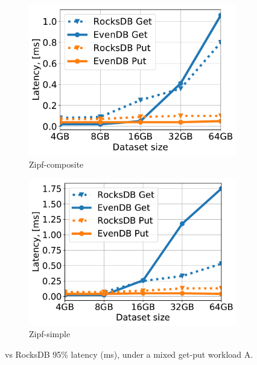 \begin{figure}[htb]
\centering
\begin{subfigure}{0.49\linewidth}
\includegraphics[width=\textwidth]{figs/tail_flurry_line.pdf}
\caption{Zipf-composite}
\label{fig:tail_latency:co}
\end{subfigure}
\begin{subfigure}{0.49\linewidth}
\includegraphics[width=\textwidth]{figs/tail_zipf_line.pdf}
\caption{Zipf-simple}
\label{fig:tail_latency:si}
\end{subfigure}
\caption{{\sys\/ vs RocksDB 95\% latency (ms), under a mixed get-put workload A.}}
\label{fig:tail_latency}
\end{figure}


